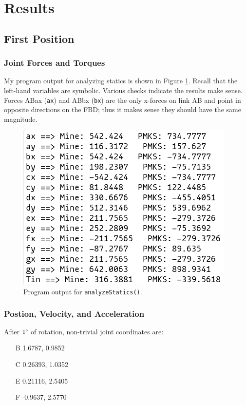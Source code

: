 \documentclass[12pt]{article}
\begin{document}
\section{Results}%
\label{res}

\subsection{First Position}%
\label{res.first}

\subsubsection{Joint Forces and Torques}%
\label{res.first.joints}

My program output for analyzing statics is shown in Figure \ref{fig:static-forces}. Recall that the left-hand variables are symbolic. Various checks indicate the results make sense. Forces ABax (\texttt{ax}) and ABbx (\texttt{bx}) are the only x-forces on link AB and point in opposite directions on the FBD; thus it makes sense they should have the same magnitude.

\begin{figure}[ht]
  \centering
  \includegraphics[scale=0.6]{../static-forces.png}
  \caption{\label{fig:static-forces}Program output for \texttt{analyzeStatics()}.}
\end{figure}

\subsubsection{Postion, Velocity, and Acceleration}%
\label{res.first.kin}

After $1\degree$ of rotation, non-trivial joint coordinates are:
\begin{enumerate}
        \item[B]  1.6787,  0.9852
        \item[C]  0.26393, 1.0352
        \item[E]  0.21116, 2.5405
        \item[F] -0.9637,  2.5770
\end{enumerate}
\end{document}
